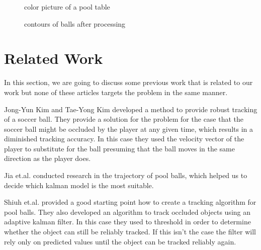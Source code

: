 \documentclass[notitlepage, a4paper, 11pt]{scrartcl}
\begin{document}
\begin{multicols}{2}
\begin{figure}[H]
    \centering
    \caption{color picture of a pool table}
    \label{pic:pool-color}
\end{figure}

\begin{figure}[H]
    \centering
    \caption{contours of balls after processing}
    \label{pic:pool-bw}
\end{figure}

\section{Related Work}

In this section, we are going to discuss some previous work that is related to our work but none of these articles targets the problem in the same manner.

Jong-Yun Kim and Tae-Yong Kim \cite{kim} developed a method to provide robust tracking of a soccer ball. 
They provide a solution for the problem for the case that the soccer ball might be occluded by the player at any given time,
which results in a diminished tracking accuracy. 
In this case they used the velocity vector of the player to substitute for the ball presuming that the ball moves in the same direction as the player does.

Jia et.al. \cite{jia} conducted research in the trajectory of pool balls, which helped us to decide which kalman model is the most suitable.

Shiuh et.al. \cite{shiuh} provided a good starting point how to create a tracking algorithm for pool balls. They also developed an algorithm to track occluded objects using an adaptive kalman filter.
In this case they used to threshold in order to determine whether the object can still be reliably tracked. If this isn't the case the filter will rely only on predicted values until the object can be tracked reliably again.


\end{multicols}
\end{document}
